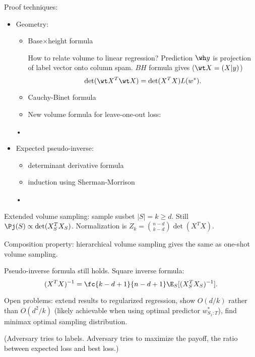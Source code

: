 Proof techniques:
\begin{itemize}
\item Geometry: 
\begin{itemize}
\item
Base$\times$height formula

How to relate volume to linear regression? Prediction $\wh y$ is projection of label vector onto column spam. $BH$ formula gives  ($\wt X = (X|y)$)
$$
\det(\wt X^T \wt X) = \det(X^TX)L(w^*).
$$
\item
Cauchy-Binet formula
\item 
New volume formula for leave-one-out loss: 
\end{itemize}•
\item Expected pseudo-inverse:
\begin{itemize}
\item
determinant derivative formula
\item
induction using Sherman-Morrison
\end{itemize}•
\end{itemize}

Extended volume sampling: sample susbet $|S|=k\ge d$. Still $\Pj(S)\propto \det(X_S^TX_S)$. Normalization is $Z_k=\binom{n-d}{k-d}\det(X^TX)$.

Composition property: hierarchical volume sampling gives the same as one-shot volume sampling.

Pseudo-inverse formula still holds. Square inverse formula:
$$
(X^TX)^{-1} = \fc{k-d+1}{n-d+1}\E_S[(X_S^TX_S)^{-1}].
$$


Open problems: extend results to regularized regression, show $O(d/k)$ rather than $O(d^2/k)$ (likely achievable when using optimal predictor $w_{S_1:T}^*$), find minimax optimal sampling distribution.

(Adversary tries to labels. Adversary tries to maximize the payoff, the ratio between expected loss and best loss.)



\printbibliography
